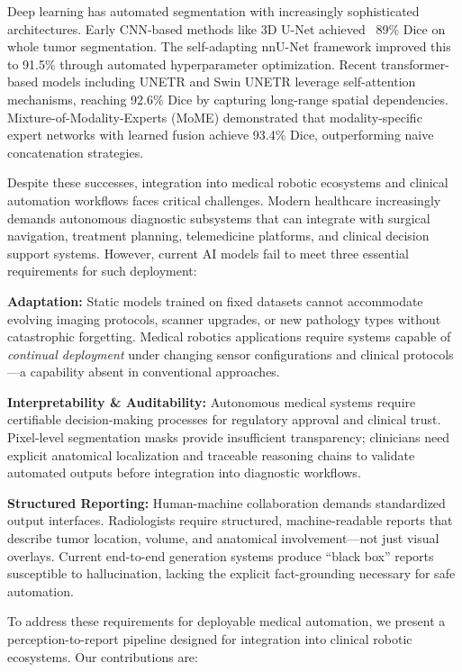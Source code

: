 \documentclass[conference]{IEEEtran}
\begin{document}
Deep learning has automated segmentation with increasingly sophisticated architectures. Early CNN-based methods like 3D U-Net \cite{ronneberger2015unet} achieved ~89\% Dice on whole tumor segmentation. The self-adapting nnU-Net framework \cite{isensee2021nnu} improved this to 91.5\% through automated hyperparameter optimization. Recent transformer-based models including UNETR \cite{hatamizadeh2022unetr} and Swin UNETR \cite{hatamizadeh2022swin} leverage self-attention mechanisms, reaching 92.6\% Dice by capturing long-range spatial dependencies. Mixture-of-Modality-Experts (MoME) \cite{zhang2024mome} demonstrated that modality-specific expert networks with learned fusion achieve 93.4\% Dice, outperforming naive concatenation strategies.

Despite these successes, integration into medical robotic ecosystems and clinical automation workflows faces critical challenges. Modern healthcare increasingly demands autonomous diagnostic subsystems that can integrate with surgical navigation, treatment planning, telemedicine platforms, and clinical decision support systems. However, current AI models fail to meet three essential requirements for such deployment:

\textbf{Adaptation:} Static models trained on fixed datasets cannot accommodate evolving imaging protocols, scanner upgrades, or new pathology types without catastrophic forgetting. Medical robotics applications require systems capable of \textit{continual deployment} under changing sensor configurations and clinical protocols—a capability absent in conventional approaches.

\textbf{Interpretability \& Auditability:} Autonomous medical systems require certifiable decision-making processes for regulatory approval and clinical trust. Pixel-level segmentation masks provide insufficient transparency; clinicians need explicit anatomical localization and traceable reasoning chains to validate automated outputs before integration into diagnostic workflows.

\textbf{Structured Reporting:} Human-machine collaboration demands standardized output interfaces. Radiologists require structured, machine-readable reports that describe tumor location, volume, and anatomical involvement—not just visual overlays. Current end-to-end generation systems produce ``black box'' reports susceptible to hallucination, lacking the explicit fact-grounding necessary for safe automation.

To address these requirements for deployable medical automation, we present a perception-to-report pipeline designed for integration into clinical robotic ecosystems. Our contributions are:
\end{document}
